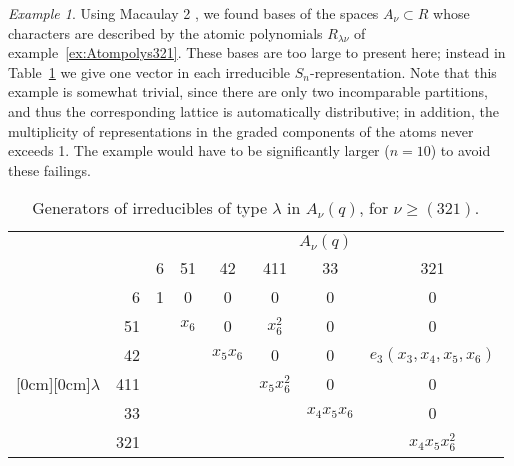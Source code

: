 \documentclass[12pt]{article}
\newcommand{\la}{{\lambda}}
\numberwithin{equation}{section}
\theoremstyle{plain}
\theoremstyle{definition}
\theoremstyle{remark}
\newtheorem{example}[theorem]{Example}
\begin{document}
\begin{example}
Using Macaulay 2 \cite{Macaulay2}, we found bases of the spaces
$A_\nu\subset R$ whose characters are described by the atomic
polynomials $R_{\la\nu}$ of example~\ref{ex:Atompolys321}.  These
bases are too large to present here; instead in
Table~\ref{table:Atoms321} we give one vector in each irreducible
$S_n$-representation.  Note that this example is somewhat trivial,
since there are only two incomparable partitions, and thus the
corresponding lattice is automatically distributive; in addition, the
multiplicity of representations in the graded components of the atoms
never exceeds 1.  The example would have to be significantly larger
($n=10$) to avoid these failings.
\end{example}

\begin{table}
\begin{center}
\begin{tabular}{rr|cccccc}
&&\multicolumn{6}{c}{$A_{\nu}(q)$}\\
& & 6 & 51 & 42 & 411 & 33 & 321 \\
\hline
&6 & 1 & 0 & 0 & 0 & 0 & 0 \\
&51 & & $x_6$ & 0 & $x_6^2$ & 0 & 0 \\
&42 & & & $x_5x_6$ & 0 & 0 & $e_3(x_3,x_4,x_5,x_6)$ \\
\raisebox{1.5ex}[0cm][0cm]{$\lambda$}
&411 & & & & $x_5x_6^2$ & 0 & 0 \\
&33 & & & & & $x_4x_5x_6$ & 0 \\
&321 & & & & & & $x_4x_5x_6^2$ \\
\end{tabular}
\end{center}
\caption{Generators of irreducibles of type $\la$ in $A_{\nu}(q)$, for $\nu\geq(321)$.}
\label{table:Atoms321}
\end{table}
\end{document}
